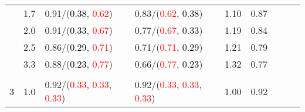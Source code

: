 \documentclass[10pt,a4paper]{report}
\begin{document}
\begin{table}[!htbp]
\begin{center}
{\begin{tabular}{ccllccccc}
				  & 1.7                               & 0.91/(\textcolor{black}{0.38}, \textcolor{red}{0.62})                                                                                                                                         & 0.83/(\textcolor{red}{0.62}, \textcolor{black}{0.38})                                                                                                                                         & 1.10             & 0.87                     \\
				  & 2.0                               & 0.91/(\textcolor{black}{0.33}, \textcolor{red}{0.67})                                                                                                                                         & 0.77/(\textcolor{red}{0.67}, \textcolor{black}{0.33})                                                                                                                                         & 1.19             & 0.84                     \\
				  & 2.5                               & 0.86/(\textcolor{black}{0.29}, \textcolor{red}{0.71})                                                                                                                                         & 0.71/(\textcolor{red}{0.71}, \textcolor{black}{0.29})                                                                                                                                         & 1.21             & 0.79                     \\
				  & 3.3                               & 0.88/(\textcolor{black}{0.23}, \textcolor{red}{0.77})                                                                                                                                         & 0.66/(\textcolor{red}{0.77}, \textcolor{black}{0.23})                                                                                                                                         & 1.32             & 0.77                     \\
				  &                                   &                                                                                                                                                                                               &                                                                                                                                                                                               &                                             \\
				3 & 1.0                               & 0.92/(\textcolor{red}{0.33}, \textcolor{red}{0.33}, \textcolor{red}{0.33})                                                                                                                    & 0.92/(\textcolor{red}{0.33}, \textcolor{red}{0.33}, \textcolor{red}{0.33})                                                                                                                    & 1.00             & 0.92                     \\

\end{tabular}}
\end{center}
\end{table}
\end{document}
